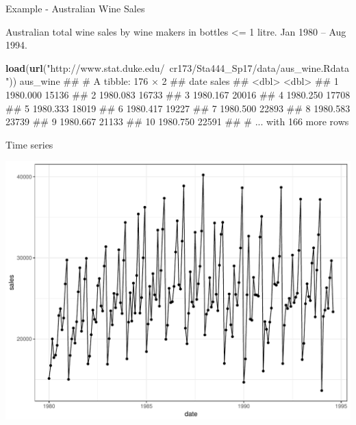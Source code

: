 \documentclass[11pt,ignorenonframetext,]{beamer}
\newenvironment{Shaded}{}{}
\newcommand{\KeywordTok}[1]{\textcolor[rgb]{0.00,0.44,0.13}{\textbf{#1}}}
\newcommand{\StringTok}[1]{\textcolor[rgb]{0.25,0.44,0.63}{#1}}
\newcommand{\NormalTok}[1]{#1}
\let\oldShaded\Shaded
\let\endoldShaded\endShaded
\renewenvironment{Shaded}{\footnotesize\begin{spacing}{0.9}\oldShaded}{\endoldShaded\end{spacing}}
\begin{document}
\begin{frame}[fragile]{Example - Australian Wine Sales}

Australian total wine sales by wine makers in bottles \textless{}= 1
litre. Jan 1980 -- Aug 1994.

\begin{Shaded}
\begin{Highlighting}[]
\KeywordTok{load}\NormalTok{(}\KeywordTok{url}\NormalTok{(}\StringTok{"http://www.stat.duke.edu/~cr173/Sta444_Sp17/data/aus_wine.Rdata"}\NormalTok{))}
\NormalTok{aus_wine}
\NormalTok{## # A tibble: 176 × 2}
\NormalTok{##        date sales}
\NormalTok{##       <dbl> <dbl>}
\NormalTok{## 1  1980.000 15136}
\NormalTok{## 2  1980.083 16733}
\NormalTok{## 3  1980.167 20016}
\NormalTok{## 4  1980.250 17708}
\NormalTok{## 5  1980.333 18019}
\NormalTok{## 6  1980.417 19227}
\NormalTok{## 7  1980.500 22893}
\NormalTok{## 8  1980.583 23739}
\NormalTok{## 9  1980.667 21133}
\NormalTok{## 10 1980.750 22591}
\NormalTok{## # ... with 166 more rows}
\end{Highlighting}
\end{Shaded}

\end{frame}

\begin{frame}{Time series}

\includegraphics{Lec6_files/figure-beamer/unnamed-chunk-10-1.pdf}

\end{frame}
\end{document}
